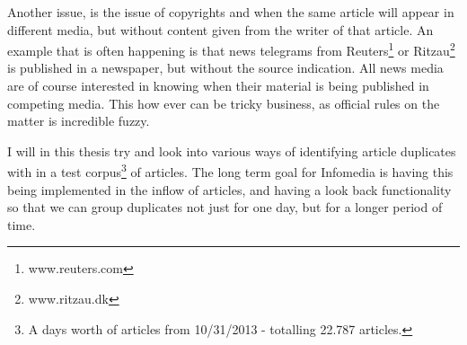 Another issue, is the issue of copyrights and when the same article will appear in different media, but without content given from the writer of that article. An example that is often happening is that news telegrams from Reuters\footnote{www.reuters.com} or Ritzau\footnote{www.ritzau.dk} is published in a newspaper, but without the source indication. All news media are of course interested in knowing when their material is being published in competing media. This how ever can be tricky business, as official rules on the matter is incredible fuzzy.

I will in this thesis try and look into various ways of identifying article duplicates with in a test corpus\footnote{A days worth of articles from 10/31/2013 - totalling 22.787 articles.} of articles. The long term goal for Infomedia is having this being implemented in the inflow of articles, and having a look back functionality so that we can group duplicates not just for one day, but for a longer period of time. 

